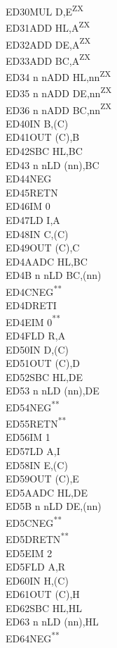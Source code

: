 \documentclass[twoside,openright,a4paper]{book}
\newcommand{\UNDOC}{\textnormal{\textsuperscript{**}}}
\newcommand{\ZXN}{\textnormal{\textsuperscript{ZX}}}
\begin{document}
\begin{multicols}{3}
{\begin{tabbing}
	ED30\>MUL D,E\ZXN\\
	ED31\>ADD HL,A\ZXN\\
	ED32\>ADD DE,A\ZXN\\
	ED33\>ADD BC,A\ZXN\\
	ED34 n n\>ADD HL,nn\ZXN\\
	ED35 n n\>ADD DE,nn\ZXN\\
	ED36 n n\>ADD BC,nn\ZXN\\
	ED40\>IN B,(C)\\
	ED41\>OUT (C),B\\
	ED42\>SBC HL,BC\\
	ED43 n n\>LD (nn),BC\\
	ED44\>NEG\\
	ED45\>RETN\\
	ED46\>IM 0\\
	ED47\>LD I,A\\
	ED48\>IN C,(C)\\
	ED49\>OUT (C),C\\
	ED4A\>ADC HL,BC\\
	ED4B n n\>LD BC,(nn)\\
	ED4C\>NEG\UNDOC\\
	ED4D\>RETI\\
	ED4E\>IM 0\UNDOC\\
	ED4F\>LD R,A\\
	ED50\>IN D,(C)\\
	ED51\>OUT (C),D\\
	ED52\>SBC HL,DE\\
	ED53 n n\>LD (nn),DE\\
	ED54\>NEG\UNDOC\\
	ED55\>RETN\UNDOC\\
	ED56\>IM 1\\
	ED57\>LD A,I\\
	ED58\>IN E,(C)\\
	ED59\>OUT (C),E\\
	ED5A\>ADC HL,DE\\
	ED5B n n\>LD DE,(nn)\\
	ED5C\>NEG\UNDOC\\
	ED5D\>RETN\UNDOC\\
	ED5E\>IM 2\\
	ED5F\>LD A,R\\
	ED60\>IN H,(C)\\
	ED61\>OUT (C),H\\
	ED62\>SBC HL,HL\\
	ED63 n n\>LD (nn),HL\\
	ED64\>NEG\UNDOC\\

\end{tabbing}}
\end{multicols}
\end{document}
